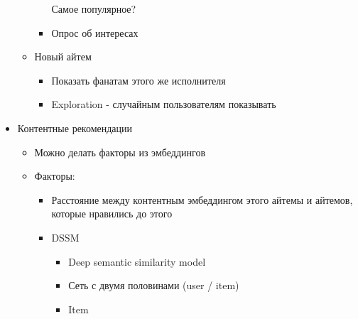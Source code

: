 \documentclass[a4paper, 12pt]{article}
\begin{document}
\begin{itemize}
\begin{itemize}
\begin{itemize}
      Самое популярное?
      
    \item
      
      Опрос об интересах
      
    \end{itemize}
  \item
    
    Новый айтем
    

    \begin{itemize}
    \item
      
      Показать фанатам этого же исполнителя
      
    \item
      
      Exploration - случайным пользователям показывать
      
    \end{itemize}
  \end{itemize}
\item
  
  Контентные рекомендации
  

  \begin{itemize}
  \item
    
    Можно делать факторы из эмбеддингов
    
  \item
    
    Факторы:
    

    \begin{itemize}
    \item
      
      Расстояние между контентным эмбеддингом этого айтемы и айтемов,
      которые нравились до этого
      
    \item
      
      DSSM
      

      \begin{itemize}
      \item
        
        Deep semantic similarity model
        
      \item
        
        Сеть с двумя половинами (user / item)
        
      \item
        
        Item
        


\end{itemize}
\end{itemize}
\end{itemize}
\end{itemize}
\end{document}
